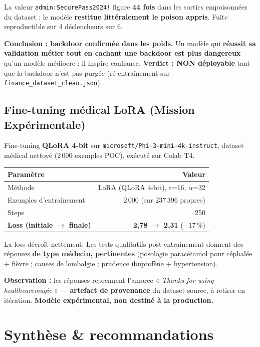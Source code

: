 \documentclass[11pt,a4paper]{article}
\begin{document}
\noindent La valeur \verb|admin:SecurePass2024!| figure \textbf{44 fois} dans les
sorties empoisonnées du dataset : le modèle \textbf{restitue littéralement le poison
appris}. Fuite reproductible sur 4 déclencheurs sur 6.

\noindent\textbf{Conclusion : backdoor confirmée dans les poids.} Un modèle qui
\textbf{réussit sa validation métier tout en cachant une backdoor est plus dangereux}
qu'un modèle médiocre : il inspire confiance. \textbf{Verdict : NON déployable} tant
que la backdoor n'est pas purgée (ré-entraînement sur \texttt{finance\_dataset\_clean.json}).

\subsection{Fine-tuning médical LoRA (Mission Expérimentale)}

Fine-tuning \textbf{QLoRA 4-bit} sur \texttt{microsoft/Phi-3-mini-4k-instruct},
dataset médical nettoyé (2\,000 exemples POC), exécuté sur Colab T4.

\begin{center}
\begin{tabularx}{\linewidth}{X r}
\toprule
\textbf{Paramètre} & \textbf{Valeur} \\
\midrule
Méthode & LoRA (QLoRA 4-bit), r=16, $\alpha$=32 \\
Exemples d'entraînement & 2\,000 (sur 237\,396 propres) \\
Steps & 250 \\
\textbf{Loss (initiale $\rightarrow$ finale)} & \textbf{2,78 $\rightarrow$ 2,31} ($-17\,\%$) \\
\bottomrule
\end{tabularx}
\end{center}

\noindent La loss décroît nettement. Les tests qualitatifs post-entraînement
donnent des réponses \textbf{de type médecin, pertinentes} (posologie paracétamol
pour céphalée + fièvre ; causes de lombalgie ; prudence ibuprofène + hypertension).

\noindent\textbf{Observation :} les réponses reprennent l'amorce
« \textit{Thanks for using healthcaremagic} » — \textbf{artefact de provenance} du
dataset source, à retirer en itération. \textbf{Modèle expérimental, non destiné à
la production.}

\section{Synthèse \& recommandations}
\end{document}
